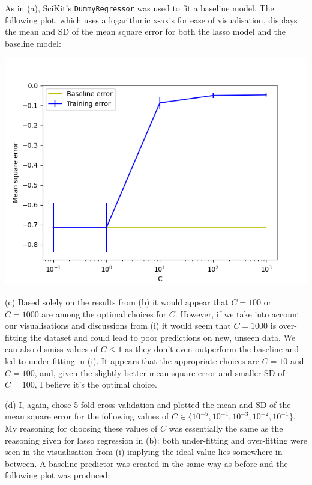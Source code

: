 \documentclass[12pt]{article}
\begin{document}
As in (a), SciKit's \texttt{DummyRegressor} was used to fit a baseline model. The following plot, which uses a logarithmic x-axis for ease of visualisation, displays the mean and SD of the mean square error for both the lasso model and the baseline model:

\begin{center}
    \includegraphics[scale=0.65]{fig_11.png}
\end{center}

\noindent (c) Based solely on the results from (b) it would appear that $C = 100$ or $C = 1000$ are among the optimal choices for $C$. However, if we take into account our visualisations and discussions from (i) it would seem that $C = 1000$ is over-fitting the dataset and could lead to poor predictions on new, unseen data. We can also dismiss values of $C \leq 1$ as they don't even outperform the baseline and led to under-fitting in (i). It appears that the appropriate choices are $C = 10$ and $C = 100$, and, given the slightly better mean square error and smaller SD of $C = 100$, I believe it's the optimal choice.

\noindent (d) I, again, chose 5-fold cross-validation and plotted the mean and SD of the mean square error for the following values of $C \in \{10^{-5}, 10^{-4}, 10^{-3}, 10^{-2}, 10^{-1}\}$. My reasoning for choosing these values of $C$ was essentially the same as the reasoning given for lasso regression in (b): both under-fitting and over-fitting were seen in the visualisation from (i) implying the ideal value lies somewhere in between. A baseline predictor was created in the same way as before and the following plot was produced:
\end{document}
